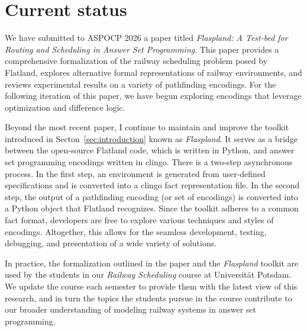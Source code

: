 \section{Current status}\label{sec:status}

We have submitted to ASPOCP 2026 a paper titled \textit{Flaspland: A Test-bed for Routing and Scheduling in Answer Set Programming}.
This paper 
provides a comprehensive formalization of the railway scheduling problem posed by Flatland,
explores alternative formal representations of railway environments,
and reviews experimental results on a variety of pathfinding encodings.
For the following iteration of this paper, 
we have begun exploring encodings that leverage optimization and difference logic.

Beyond the most recent paper, I continue to maintain and improve the toolkit introduced in Secton~\ref{sec:introduction} 
known as \textit{Flaspland}.
It serves as a bridge between the open-source Flatland code, which is written in Python, and answer set programming encodings written in clingo.
There is a two-step asynchronous process.
In the first step, an environment is generated from user-defined specifications and is converted into a clingo fact representation file.
In the second step, the output of a pathfinding encoding (or set of encodings) is converted into a Python object that Flatland recognizes.
Since the toolkit adheres to a common fact format, developers are free to explore various techniques and styles of encodings.
Altogether, this allows for the seamless development, testing, debugging, and presentation of a wide variety of solutions.

In practice, the formalization outlined in the paper and the \textit{Flaspland} toolkit are used by the students in our \textit{Railway Scheduling} course at Universit\"at Potsdam.
We update the course each semester to provide them with the latest view of this research,
and in turn the topics the students pursue in the course contribute to our broader understanding of modeling railway systems in answer set programming.

%
